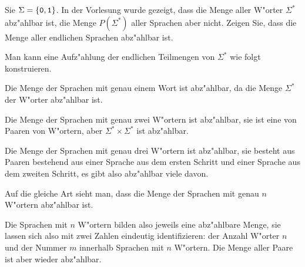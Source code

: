 Sie $\Sigma=\{{\tt 0},{\tt 1}\}$. In der Vorlesung wurde gezeigt, dass 
die Menge aller W"orter $\Sigma^*$ abz"ahlbar ist, die Menge $P(\Sigma^*)$
aller Sprachen aber nicht. Zeigen Sie, dass die Menge aller endlichen
Sprachen abz"ahlbar ist.

\begin{loesung}
Man kann eine Aufz"ahlung der endlichen Teilmengen von $\Sigma^*$ wie
folgt konstruieren.
\begin{compactenum}
\item Die Menge der Sprachen mit genau einem Wort ist abz"ahlbar, da die
Menge $\Sigma^*$ der W"orter abz"ahlbar ist.
\item Die  Menge der Sprachen mit genau zwei W"ortern ist abz"ahlbar,
sie ist eine von Paaren von W"ortern, aber $\Sigma^*\times \Sigma^*$
ist abz"ahlbar.
\item Die Menge der Sprachen mit genau drei W"ortern ist abz"ahlbar,
sie besteht aus Paaren bestehend aus einer Sprache aus dem ersten
Schritt und einer Sprache aus dem zweiten Schritt, es gibt also 
abz"ahlbar viele davon.
\item Auf die gleiche Art sieht man, dass die Menge der Sprachen mit
genau $n$ W"ortern abz"ahlbar ist.
\end{compactenum}
Die Sprachen mit $n$ W"ortern bilden also jeweils eine abz"ahlbare Menge,
sie lassen sich also mit zwei Zahlen eindeutig identifizieren: der Anzahl
W"orter $n$ und der Nummer $m$ innerhalb Sprachen mit $n$ W"ortern.
Die Menge aller Paare ist aber wieder abz"ahlbar.
\end{loesung}

